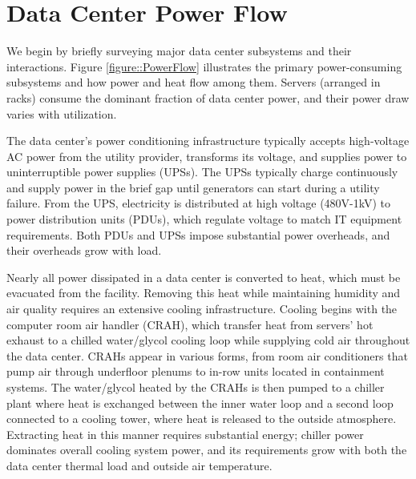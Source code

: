 
\vspace{0.1 in}
\section{Data Center Power Flow}

We begin by briefly surveying major data center subsystems and their interactions. Figure  \ref{figure::PowerFlow} illustrates the primary power-consuming subsystems and how power and heat flow among them.  Servers (arranged in racks) consume the dominant fraction of data center power, and their power draw varies with utilization.  

The data center's power conditioning infrastructure typically accepts high-voltage AC power from the utility provider, transforms its voltage, and supplies power to uninterruptible power supplies (UPSs).  The UPSs typically charge continuously and supply power in the brief gap until generators can start during a utility failure.   From the UPS, electricity is distributed at high voltage (480V-1kV) to power distribution units (PDUs), which  regulate voltage to match IT equipment requirements.  Both PDUs and UPSs impose substantial power overheads, and their overheads grow with load. 

Nearly all power dissipated in a data center is converted to heat, which must be evacuated from the facility.  Removing this heat while maintaining humidity and air quality requires an extensive cooling infrastructure.  Cooling begins with the computer room air handler (CRAH), which transfer heat from servers' hot exhaust to a chilled water/glycol cooling loop while supplying cold air throughout the data center.
CRAHs appear in various forms, from room air conditioners that pump air through underfloor plenums to in-row units located in containment systems.
The water/glycol heated by the CRAHs is then pumped to a chiller plant where heat is exchanged between the inner water loop and a second loop connected to a cooling tower, where heat is released to the outside atmosphere.
Extracting heat in this manner requires substantial energy; chiller power dominates overall cooling system power, and its requirements grow with both the data center thermal load and outside air temperature. 





